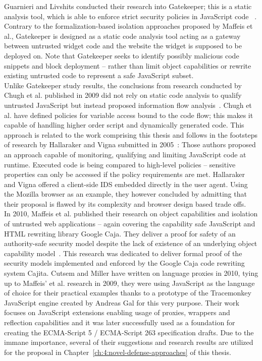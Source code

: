 \begin{itemize}
      Guarnieri and Livshits conducted their research into Gatekeeper; this is a static analysis tool, which is able to enforce strict security policies in JavaScript code ~\cite{guarnieri2009gatekeeper}. Contrary to the formalization-based isolation approaches proposed by Maffeis et al., Gatekeeper is designed as a static code analysis tool acting as a gateway between untrusted widget code and the website the widget is supposed to be deployed on. Note that Gatekeeper seeks to identify possibly malicious code snippets and block deployment -- rather than limit object capabilities or rewrite existing untrusted code to represent a safe JavaScript subset. \\

      Unlike Gatekeeper study results, the conclusions from research conducted by Chugh et al. published in 2009 did not rely on static code analysis to qualify untrusted JavaScript but instead proposed information flow analysis~\cite{chugh2009staged}. Chugh et al. have defined policies for variable access bound to the code flow; this makes it capable of handling higher order script and dynamically generated code. This approach is related to the work comprising this thesis and follows in the footsteps of research by Hallaraker and Vigna submitted in 2005~\cite{hallaraker2005detecting}: Those authors proposed an approach capable of monitoring, qualifying and limiting JavaScript code at runtime. Executed code is being compared to high-level policies -- sensitive properties can only be accessed if the policy requirements are met. Hallaraker and Vigna offered a client-side IDS embedded directly in the user agent. Using the Mozilla browser as an example, they however concluded by admitting that their proposal is flawed by its complexity and browser design based trade offs. \\

      In 2010, Maffeis et al. published their research on object capabilities and isolation of untrusted web applications -- again covering the capability safe JavaScript and HTML rewriting library Google Caja. They deliver a proof for safety of an authority-safe security model despite the lack of existence of an underlying object capability model~\cite{mmt-oakland10}. This research was dedicated to deliver formal proof of the security models implemented and enforced by the Google Caja code rewriting system Cajita. Cutsem and Miller have written on language proxies in 2010, tying up to Maffeis' et al. research in 2009, they were using JavaScript as the language of choice for their practical examples thanks to a prototype of the Tracemonkey JavaScript engine created by Andreas Gal for this very purpose. Their work focuses on JavaScript extensions enabling usage of proxies, wrappers and reflection capabilities and it was later successfully used as a foundation for creating the ECMA-Script 5 / ECMA-Script 263 specification drafts. Due to the immane importance, several of their suggestions and research results are utilized for the proposal in Chapter~\ref{ch:4:novel-defense-approaches} of this thesis. \\


\end{itemize}
